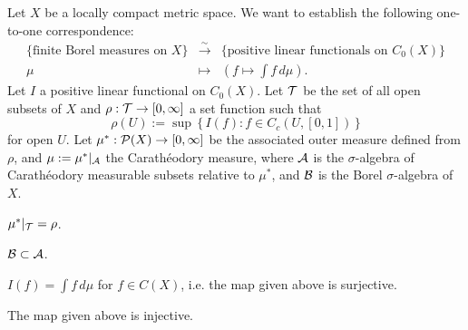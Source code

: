 \documentclass{../../large}
\begin{document}




\begin{prb}
Let $X$ be a locally compact metric space.
We want to establish the following one-to-one correspondence:
\[\begin{array}{ccc}
\{\text{finite Borel measures on $X$}\} & \xrightarrow{\sim} & \{\text{positive linear functionals on $C_0(X)$}\}\\
\mu & \mapsto & (f\mapsto\int f\,d\mu).
\end{array}\]
Let $I$ a positive linear functional on $C_0(X)$.
Let $\mathcal{T}$ be the set of all open subsets of $X$ and $\rho:\mathcal{T}\to[0,\infty]$ a set function such that
\[\rho(U):=\sup\,\{\,I(f):f\in C_c(U,[0,1])\,\}\]
for open $U$.
Let $\mu^*:\mathcal{P}(X)\to[0,\infty]$ be the associated outer measure defined from $\rho$, and $\mu:=\mu^*|_{\mathcal{A}}$ the Carath\'eodory measure, where $\mathcal{A}$ is the $\sigma$-algebra of Carath\'eodory measurable subsets relative to $\mu^*$, and $\mathcal{B}$ is the Borel $\sigma$-algebra of $X$.
\begin{parts}
\item $\mu^*|_{\mathcal{T}}=\rho$.
\item $\mathcal{B}\subset\mathcal{A}$.
\item $I(f)=\int f\,d\mu$ for $f\in C(X)$, i.e. the map given above is surjective.
\item The map given above is injective.
\end{parts}
\end{prb}
\end{document}
